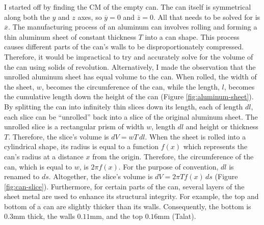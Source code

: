 \documentclass[11pt]{article}
\begin{document}
    I started off by finding the CM of the empty can. The can itself is symmetrical along both the $y$ and $z$ axes, so $\overline{y} = 0$ and $\overline{z} = 0$. All that needs to be solved for is $\overline{x}$. The manufacturing process of an aluminum can involves rolling and forming a thin aluminum sheet of constant thickness $T$ into a can shape. This process causes different parts of the can's walls to be disproportionately compressed. Therefore, it would be impractical to try and accurately solve for the volume of the can using solids of revolution. Alternatively, I made the observation that the unrolled aluminum sheet has equal volume to the can. When rolled, the width of the sheet, $w$, becomes the circumference of the can, while the length, $l$, becomes the cumulative length down the height of the can (Figure \ref{fig:aluminum-sheet}). By splitting the can into infinitely thin slices down its length, each of length $dl$, each slice can be ``unrolled'' back into a slice of the original aluminum sheet. The unrolled slice is a rectangular prism of width $w$, length $dl$ and height or thickness $T$. Therefore, the slice's volume is $dV = wT \, dl$. When the sheet is rolled into a cylindrical shape, its radius is equal to a function $f(x)$ which represents the can's radius at a distance $x$ from the origin. Therefore, the circumference of the can, which is equal to $w$, is $2 \pi f(x)$. For the purpose of convention, $dl$ is renamed to $ds$. Altogether, the slice's volume is $dV = 2 \pi T f(x) \, ds$ (Figure \ref{fig:can-slice}). Furthermore, for certain parts of the can, several layers of the sheet metal are used to enhance its structural integrity. For example, the top and bottom of a can are slightly thicker than its walls. Consequently, the bottom is $0.3 \mathrm{mm}$ thick, the walls $0.11 \mathrm{mm}$, and the top $0.16 \mathrm{mm}$ (Talat).
\end{document}
